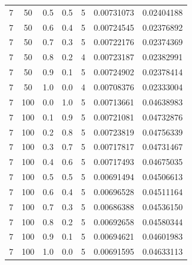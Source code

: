 \documentclass[12pt, a4paper]{report}
\begin{document}
\begin{table} [H]
\begin{tabular}[l]{|c c c c c c c|}
			7 & 50 & 0.5 & 0.5 & 5 & 0.00731073 & 0.02404188 \\
			
			7 & 50 & 0.6 & 0.4 & 5 & 0.00724545 & 0.02376892 \\
			
			7 & 50 & 0.7 & 0.3 & 5 & 0.00722176 & 0.02374369 \\
			
			7 & 50 & 0.8 & 0.2 & 4 & 0.00723187 & 0.02382991 \\
			
			7 & 50 & 0.9 & 0.1 & 5 & 0.00724902 & 0.02378414 \\
			
			7 & 50 & 1.0 & 0.0 & 4 & 0.00708376 & 0.02333004 \\
			
			7 & 100 & 0.0 & 1.0 & 5 & 0.00713661 & 0.04638983 \\
			
			7 & 100 & 0.1 & 0.9 & 5 & 0.00721081 & 0.04732876 \\
			
			7 & 100 & 0.2 & 0.8 & 5 & 0.00723819 & 0.04756339 \\
			
			7 & 100 & 0.3 & 0.7 & 5 & 0.00717817 & 0.04731467 \\
			
			7 & 100 & 0.4 & 0.6 & 5 & 0.00717493 & 0.04675035 \\
			
			7 & 100 & 0.5 & 0.5 & 5 & 0.00691494 & 0.04506613 \\
			
			7 & 100 & 0.6 & 0.4 & 5 & 0.00696528 & 0.04511164 \\
			
			7 & 100 & 0.7 & 0.3 & 5 & 0.00686388 & 0.04536150 \\
			
			7 & 100 & 0.8 & 0.2 & 5 & 0.00692658 & 0.04580344 \\
			
			7 & 100 & 0.9 & 0.1 & 5 & 0.00694621 & 0.04601983 \\
			
			7 & 100 & 1.0 & 0.0 & 5 & 0.00691595 & 0.04633113 \\\hline
		\end{tabular}
	\end{table}
	
\end{document}
